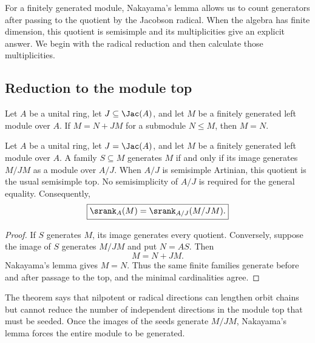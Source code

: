 \begin{readerroadmap}
For a finitely generated module, Nakayama's lemma allows us to count generators after passing to the quotient by the Jacobson radical.  When the algebra has finite dimension, this quotient is semisimple and its multiplicities give an explicit answer.  We begin with the radical reduction and then calculate those multiplicities.
\end{readerroadmap}
\subsection{Reduction to the module top}

\begin{classicalinput}
\label{ci:nakayama}
Let $A$ be a unital ring, let $J\subseteq\Jac(A)$, and let $M$ be a finitely generated left module over $A$.  If $M=N+JM$ for a submodule $N\leq M$, then $M=N$.
\end{classicalinput}

\begin{theorem}
\label{thm:module-top}
Let $A$ be a unital ring, let $J=\Jac(A)$, and let $M$ be a finitely generated left module over $A$.  A family $S\subseteq M$ generates $M$ if and only if its image generates $M/JM$ as a module over $A/J$.  When $A/J$ is semisimple Artinian, this quotient is the usual semisimple top.  No semisimplicity of $A/J$ is required for the general equality.  Consequently,
\[
\boxed{
\srank_A(M)=\srank_{A/J}(M/JM).
}
\]
\end{theorem}

\begin{proof}
If $S$ generates $M$, its image generates every quotient.  Conversely, suppose the image of $S$ generates $M/JM$ and put $N=AS$.  Then
\[
M=N+JM.
\]
Nakayama's lemma gives $M=N$.  Thus the same finite families generate before and after passage to the top, and the minimal cardinalities agree.
\end{proof}

\begin{interpretation}
The theorem says that nilpotent or radical directions can lengthen orbit chains but cannot reduce the number of independent directions in the module top that must be seeded.  Once the images of the seeds generate \(M/JM\), Nakayama's lemma forces the entire module to be generated.
\end{interpretation}

